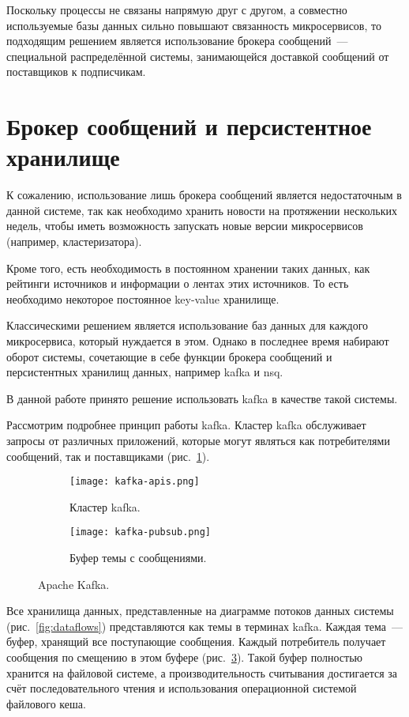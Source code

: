 Поскольку процессы не связаны напрямую друг с другом, а совместно используемые базы данных сильно повышают связанность микросервисов, то подходящим решением является использование брокера сообщений~--- специальной распределённой системы, занимающейся доставкой сообщений от поставщиков к подписчикам.

\section{Брокер сообщений и персистентное хранилище}
К сожалению, использование лишь брокера сообщений является недостаточным в данной системе, так как необходимо хранить новости на протяжении нескольких недель, чтобы иметь возможность запускать новые версии микросервисов (например, кластеризатора).

Кроме того, есть необходимость в постоянном хранении таких данных, как рейтинги источников и информации о лентах этих источников. То есть необходимо некоторое постоянное key-value хранилище.

Классическими решением является использование баз данных для каждого микросервиса, который нуждается в этом. Однако в последнее время набирают оборот системы, сочетающие в себе функции брокера сообщений и персистентных хранилищ данных, например kafka и nsq.

В данной работе принято решение использовать kafka в качестве такой системы.

Рассмотрим подробнее принцип работы kafka. Кластер kafka обслуживает запросы от различных приложений, которые могут являться как потребителями сообщений, так и поставщиками (рис.~\ref{fig:kafka-apis}).

\begin{figure}[h]
    \centering
    \begin{subfigure}{.5\textwidth}
        \centering
        \texttt{[image: kafka-apis.png]}
        \caption{Кластер kafka.}
        \label{fig:kafka-apis}
    \end{subfigure}%
    \begin{subfigure}{.5\textwidth}
        \centering
        \texttt{[image: kafka-pubsub.png]}
        \caption{Буфер темы с сообщениями.}
        \label{fig:kafka-pubsub}
    \end{subfigure}
    \caption{Apache Kafka.}
\end{figure}

Все хранилища данных, представленные на диаграмме потоков данных системы (рис.~\ref{fig:dataflows}) представляются как темы в терминах kafka. Каждая тема~--- буфер, хранящий все поступающие сообщения. Каждый потребитель получает сообщения по смещению в этом буфере (рис.~\ref{fig:kafka-pubsub}). Такой буфер полностью хранится на файловой системе, а производительность считывания достигается за счёт последовательного чтения и использования операционной системой файлового кеша.

